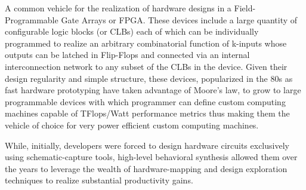 A common vehicle for the realization of hardware designs in a Field-Programmable Gate Arrays or FPGA. These devices include a large quantity of configurable logic blocks (or CLBs)
each of which can be individually programmed to realize an arbitrary combinatorial function of k-inputs  whose outputs can be latched in Flip-Flops and connected via an internal interconnection network to any subset of the CLBs in the device.  Given their  design regularity and simple structure, these devices, popularized in the 80s as fast hardware prototyping have taken advantage of Moore's law, to grow to large programmable devices with which programmer can define custom computing machines capable of TFlops/Watt performance metrics thus making them the vehicle of choice for very power efficient custom computing machines. 

While, initially, developers were forced to design hardware circuits exclusively using schematic-capture tools, high-level behavioral synthesis allowed them over the years to leverage the wealth of hardware-mapping and design exploration techniques to realize substantial productivity gains.  

